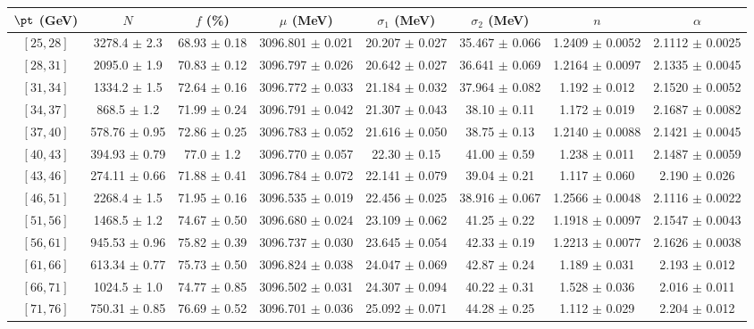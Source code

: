 \begin{tabular}{c||c|c|c|c|c|c|c}
$\pt$ (GeV) & $N$ & $f$ (\%) & $\mu$ (MeV) & $\sigma_1$ (MeV) & $\sigma_2$ (MeV) & $n$ & $\alpha$ \\
\hline
$[25, 28]$ & 3278.4 $\pm$ 2.3 & 68.93 $\pm$ 0.18 & 3096.801 $\pm$ 0.021 & 20.207 $\pm$ 0.027 & 35.467 $\pm$ 0.066 & 1.2409 $\pm$ 0.0052 & 2.1112 $\pm$ 0.0025\\
$[28, 31]$ & 2095.0 $\pm$ 1.9 & 70.83 $\pm$ 0.12 & 3096.797 $\pm$ 0.026 & 20.642 $\pm$ 0.027 & 36.641 $\pm$ 0.069 & 1.2164 $\pm$ 0.0097 & 2.1335 $\pm$ 0.0045\\
$[31, 34]$ & 1334.2 $\pm$ 1.5 & 72.64 $\pm$ 0.16 & 3096.772 $\pm$ 0.033 & 21.184 $\pm$ 0.032 & 37.964 $\pm$ 0.082 & 1.192 $\pm$ 0.012 & 2.1520 $\pm$ 0.0052\\
$[34, 37]$ & 868.5 $\pm$ 1.2 & 71.99 $\pm$ 0.24 & 3096.791 $\pm$ 0.042 & 21.307 $\pm$ 0.043 & 38.10 $\pm$ 0.11 & 1.172 $\pm$ 0.019 & 2.1687 $\pm$ 0.0082\\
$[37, 40]$ & 578.76 $\pm$ 0.95 & 72.86 $\pm$ 0.25 & 3096.783 $\pm$ 0.052 & 21.616 $\pm$ 0.050 & 38.75 $\pm$ 0.13 & 1.2140 $\pm$ 0.0088 & 2.1421 $\pm$ 0.0045\\
$[40, 43]$ & 394.93 $\pm$ 0.79 & 77.0 $\pm$ 1.2 & 3096.770 $\pm$ 0.057 & 22.30 $\pm$ 0.15 & 41.00 $\pm$ 0.59 & 1.238 $\pm$ 0.011 & 2.1487 $\pm$ 0.0059\\
$[43, 46]$ & 274.11 $\pm$ 0.66 & 71.88 $\pm$ 0.41 & 3096.784 $\pm$ 0.072 & 22.141 $\pm$ 0.079 & 39.04 $\pm$ 0.21 & 1.117 $\pm$ 0.060 & 2.190 $\pm$ 0.026\\
$[46, 51]$ & 2268.4 $\pm$ 1.5 & 71.95 $\pm$ 0.16 & 3096.535 $\pm$ 0.019 & 22.456 $\pm$ 0.025 & 38.916 $\pm$ 0.067 & 1.2566 $\pm$ 0.0048 & 2.1116 $\pm$ 0.0022\\
$[51, 56]$ & 1468.5 $\pm$ 1.2 & 74.67 $\pm$ 0.50 & 3096.680 $\pm$ 0.024 & 23.109 $\pm$ 0.062 & 41.25 $\pm$ 0.22 & 1.1918 $\pm$ 0.0097 & 2.1547 $\pm$ 0.0043\\
$[56, 61]$ & 945.53 $\pm$ 0.96 & 75.82 $\pm$ 0.39 & 3096.737 $\pm$ 0.030 & 23.645 $\pm$ 0.054 & 42.33 $\pm$ 0.19 & 1.2213 $\pm$ 0.0077 & 2.1626 $\pm$ 0.0038\\
$[61, 66]$ & 613.34 $\pm$ 0.77 & 75.73 $\pm$ 0.50 & 3096.824 $\pm$ 0.038 & 24.047 $\pm$ 0.069 & 42.87 $\pm$ 0.24 & 1.189 $\pm$ 0.031 & 2.193 $\pm$ 0.012\\
$[66, 71]$ & 1024.5 $\pm$ 1.0 & 74.77 $\pm$ 0.85 & 3096.502 $\pm$ 0.031 & 24.307 $\pm$ 0.094 & 40.22 $\pm$ 0.31 & 1.528 $\pm$ 0.036 & 2.016 $\pm$ 0.011\\
$[71, 76]$ & 750.31 $\pm$ 0.85 & 76.69 $\pm$ 0.52 & 3096.701 $\pm$ 0.036 & 25.092 $\pm$ 0.071 & 44.28 $\pm$ 0.25 & 1.112 $\pm$ 0.029 & 2.204 $\pm$ 0.012\\

\end{tabular}

